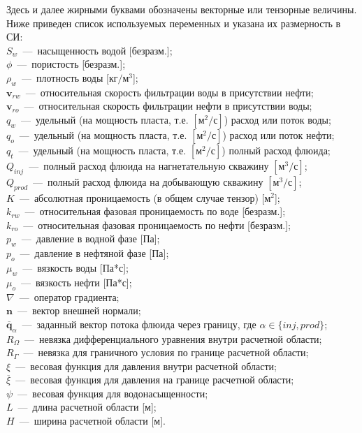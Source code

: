 Здесь и далее жирными буквами обозначены векторные или тензорные величины. Ниже приведен список
используемых переменных и указана их размерность в СИ:\\
$S_w$~---~насыщенность водой [безразм.];\\
$\phi$~---~пористость [безразм.];\\
$\rho_w$~---~плотность воды [$\text{кг}/\text{м}^3$];\\
$\bm{v}_{rw}$~---~относительная скорость фильтрации воды в присутствии нефти;\\
$\bm{v}_{ro}$~---~относительная скорость фильтрации нефти в присутствии воды;\\
$q_w$~---~удельный (на мощность пласта, т.е. $[\text{м}^2/\text{с}]$) расход или поток воды;\\
$q_o$~---~удельный (на мощность пласта, т.е. $[\text{м}^2/\text{с}]$) расход или поток нефти;\\ 
$q_t$~---~удельный (на мощность пласта, т.е. $[\text{м}^2/\text{с}]$) полный расход флюида;\\
$Q_{inj}$~---~полный расход флюида на нагнетательную скважину $[\text{м}^3/\text{с}]$;\\
$Q_{prod}$~---~полный расход флюида на добывающую скважину $[\text{м}^3/\text{с}]$;\\
$K$~---~абсолютная проницаемость (в общем случае тензор) [$\text{м}^2$];\\
$k_{rw}$~---~относительная фазовая проницаемость по воде [безразм.];\\
$k_{ro}$~---~относительная фазовая проницаемость по нефти [безразм.];\\
$p_w$~---~давление в водной фазе [Па];\\
$p_o$~---~давление в нефтяной фазе [Па];\\
$\mu_w$~---~вязкость воды [Па*с];\\
$\mu_o$~---~вязкость нефти [Па*с];\\
$\nabla$~---~оператор градиента;\\
$\bm{n}$~---~вектор внешней нормали;\\
$\overline{\bm{q}}_\alpha$~---~заданный вектор потока флюида через границу, где $\alpha \in \{inj,prod\}$;\\
$R_\Omega$~---~невязка дифференциального уравнения внутри расчетной области;\\
$R_\Gamma$~---~невязка для граничного условия по границе расчетной области;\\
$\xi$~---~весовая функция для давления внутри расчетной области;\\
$\overline{\xi}$~---~весовая функция для давления на границе расчетной области;\\
$\psi$~---~весовая функция для водонасыщенности;\\
$L$~---~длина расчетной области [м];\\
$H$~---~ширина расчетной области [м].

